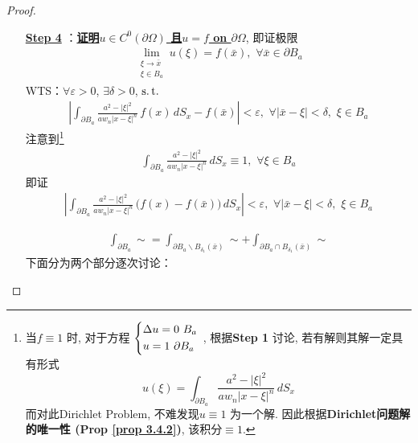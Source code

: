 \begin{thm}
\begin{proof}
\begin{enumerate}
				\vspace*{4em}
				
				\item[\underline{\textbf{Step 4}}]：\underline{\textbf{证明$u \in C^0(\partial \Omega)$ 且$u = f$ on $\partial \Omega$}}, 即证极限
				\begin{align*}
					\lim_{\substack{\xi \to \bar{x} \\ \xi \in B_a}} u(\xi) = f(\bar{x}) , \,\, \forall \bar{x} \in \partial B_a
				\end{align*}
				WTS：$\forall \varepsilon > 0$, $\exists \delta > 0$, $\operatorname{s.t.}$
				\begin{align*}
					\left| \int_{\partial B_a} \frac{a^2 - | \xi |^2}{a w_n | x - \xi |^n} \, f(x) \, dS_x - f(\bar{x}) \right| < \varepsilon , \,\, \forall | \bar{x} - \xi | < \delta , \,\, \xi \in B_a
				\end{align*}
				注意到\footnote{当$f \equiv 1$ 时, 对于方程
					$\begin{dcases*}
						\Delta u = 0 \,\, B_a \\
						u = 1 \,\, \partial B_a
					\end{dcases*}$
					, 根据\textbf{Step 1} 讨论, 若有解则其解一定具有形式
					\[ u(\xi) = \int_{\partial B_a} \frac{a^2 - | \xi |^2}{a w_n | x - \xi |^n} \, dS_x \]
					而对此Dirichlet Problem, 不难发现$u \equiv 1$ 为一个解. 因此根据\textbf{Dirichlet问题解的唯一性 (Prop \ref{prop 3.4.2})}, 该积分$\equiv 1$. }
				\begin{align*}
					\int_{\partial B_a} \frac{a^2 - | \xi |^2}{a w_n | x - \xi |^n} \, dS_x \equiv 1 , \,\, \forall \xi \in B_a
				\end{align*}
				即证
				\begin{align*}
					\left| \int_{\partial B_a} \frac{a^2 - | \xi |^2}{a w_n | x - \xi |^n} \, \Big( f(x) - f(\bar{x}) \Big) \, dS_x \right| < \varepsilon , \,\, \forall | \bar{x} - \xi | < \delta , \,\, \xi \in B_a
				\end{align*}
				
				\newpage
				\begin{align*}
					\int_{\partial B_a} \sim 
					= \int_{\partial B_a \backslash B_{\delta_1}(\bar{x})} \sim + \int_{\partial B_a \cap B_{\delta_1}(\bar{x})} \sim
				\end{align*}
				下面分为两个部分逐次讨论：
				
				\vspace*{1em}
				

\end{enumerate}
\end{proof}
\end{thm}
